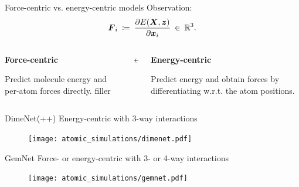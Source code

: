 \begin{frame}{Force-centric vs. energy-centric models}
    Observation: 
    \[
        \boldsymbol{F}_i \: \coloneqq \: \frac{\partial E(\boldsymbol{X}, \boldsymbol{z})}{\partial \boldsymbol{x}_i} \: \in \: \mathbb{R}^3.
    \]
    \begin{columns}
        \centering
        \begin{column}{0.35\textwidth}
           \begin{center}
                \textbf{Force-centric}
           \end{center}
           Predict molecule energy and per-atom forces directly. \textcolor{black!2}{filler}
        \end{column}
        \begin{column}{0.15\textwidth}
            \begin{center}
                $\boldsymbol{\leftrightarrow}$
            \end{center}
        \end{column}
        \begin{column}{0.35\textwidth}
            \begin{center}
                \textbf{Energy-centric}
            \end{center}
            Predict energy and obtain forces by differentiating w.r.t. 
            the atom positions.
        \end{column}
    \end{columns}
\end{frame}

\begin{frame}{DimeNet(++) }
    \centering
    Energy-centric with 3-way interactions
    \begin{figure}[H]
        \vspace*{-1em}
        \texttt{[image: atomic\_simulations/dimenet.pdf]}
    \end{figure}
\end{frame}

\begin{frame}{GemNet }
    \centering
    Force- or energy-centric with 3- or 4-way interactions
    \begin{figure}[H]
        \vspace*{-1em}
        \texttt{[image: atomic\_simulations/gemnet.pdf]}
    \end{figure}
\end{frame}

